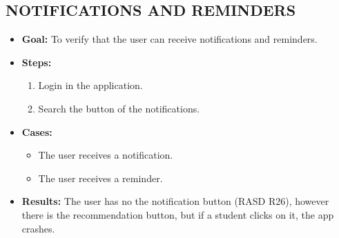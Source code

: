 \subsection{NOTIFICATIONS AND REMINDERS}\label{subsec:notifications-and-reminders}
\begin{itemize}
    \item \textbf{Goal:} To verify that the user can receive notifications and reminders.

    \item \textbf{Steps:}
    \begin{enumerate}
        \item Login in the application.
        \item Search the button of the notifications.
    \end{enumerate}
    \item \textbf{Cases:}
    \begin{itemize}
        \item The user receives a notification.
        \item The user receives a reminder.
    \end{itemize}
    \item \textbf{Results:}
    The user has no the notification button (RASD R26),
    however there is the recommendation button, but if a student clicks on it, the app crashes.

\end{itemize}

